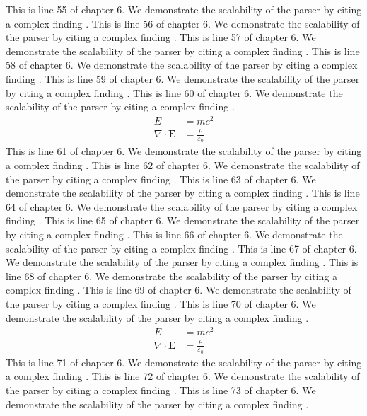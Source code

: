This is line 55 of chapter 6. We demonstrate the scalability of the parser by citing a complex finding \cite{ref6_55}.
This is line 56 of chapter 6. We demonstrate the scalability of the parser by citing a complex finding \cite{ref6_56}.
This is line 57 of chapter 6. We demonstrate the scalability of the parser by citing a complex finding \cite{ref6_57}.
This is line 58 of chapter 6. We demonstrate the scalability of the parser by citing a complex finding \cite{ref6_58}.
This is line 59 of chapter 6. We demonstrate the scalability of the parser by citing a complex finding \cite{ref6_59}.
This is line 60 of chapter 6. We demonstrate the scalability of the parser by citing a complex finding \cite{ref6_60}.
\begin{align*}
  E &= mc^2 \\
  \nabla \cdot \mathbf{E} &= \frac{\rho}{\varepsilon_0}
\end{align*}
This is line 61 of chapter 6. We demonstrate the scalability of the parser by citing a complex finding \cite{ref6_61}.
This is line 62 of chapter 6. We demonstrate the scalability of the parser by citing a complex finding \cite{ref6_62}.
This is line 63 of chapter 6. We demonstrate the scalability of the parser by citing a complex finding \cite{ref6_63}.
This is line 64 of chapter 6. We demonstrate the scalability of the parser by citing a complex finding \cite{ref6_64}.
This is line 65 of chapter 6. We demonstrate the scalability of the parser by citing a complex finding \cite{ref6_65}.
This is line 66 of chapter 6. We demonstrate the scalability of the parser by citing a complex finding \cite{ref6_66}.
This is line 67 of chapter 6. We demonstrate the scalability of the parser by citing a complex finding \cite{ref6_67}.
This is line 68 of chapter 6. We demonstrate the scalability of the parser by citing a complex finding \cite{ref6_68}.
This is line 69 of chapter 6. We demonstrate the scalability of the parser by citing a complex finding \cite{ref6_69}.
This is line 70 of chapter 6. We demonstrate the scalability of the parser by citing a complex finding \cite{ref6_70}.
\begin{align*}
  E &= mc^2 \\
  \nabla \cdot \mathbf{E} &= \frac{\rho}{\varepsilon_0}
\end{align*}
This is line 71 of chapter 6. We demonstrate the scalability of the parser by citing a complex finding \cite{ref6_71}.
This is line 72 of chapter 6. We demonstrate the scalability of the parser by citing a complex finding \cite{ref6_72}.
This is line 73 of chapter 6. We demonstrate the scalability of the parser by citing a complex finding \cite{ref6_73}.
